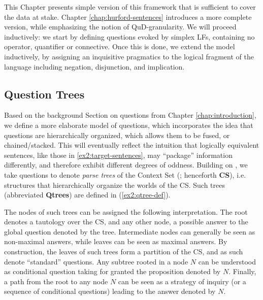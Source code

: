 This Chapter presents simple version of this framework that is sufficient to cover the data at stake. Chapter \ref{chap:hurford-sentences} introduces a more complete version, while emphasizing the notion of QuD-granularity. We will proceed inductively: we start by defining questions evoked by simplex LFs, containing no operator, quantifier or connective. Once this is done, we extend the model inductively, by assigning an inquisitive pragmatics to the logical fragment of the language including negation, disjunction, and implication.



\subsection{Question Trees}

Based on the background Section on questions from Chapter \ref{chap:introduction}, we define a more elaborate model of questions, which incorporates the idea that questions are hierarchically organized, which allows them to be fused, or chained/stacked. This will eventually reflect the intuition that logically equivalent sentences, like those in \ref{ex2:target-sentences}, may ``package'' information differently, and therefore exhibit different degrees of oddness. Building on \citet{Buring2003,Riester2019,Onea2016,Zhang2022}, we take questions to denote \textit{parse trees} of the Context Set (; henceforth \textbf{CS}), i.e. structures that hierarchically organize the worlds of the CS. Such trees (abbreviated \textbf{Qtrees}) are defined in (\ref{ex2:qtree-def}).

\begin{exe}
	\label{ex2:qtree-def}
\end{exe}


The nodes of such trees can be assigned the following interpretation. The root denotes a tautology over the CS, and any other node, a possible answer to the global question denoted by the tree. Intermediate nodes can generally be seen as non-maximal answers, while leaves can be seen as maximal answers. By construction, the leaves of such trees form a partition of the CS, and as such denote ``standard'' questions. Any subtree rooted in a node $N$ can be understood as conditional question taking for granted the proposition denoted by $N$. Finally, a path from the root to any node $N$ can be seen as a strategy of inquiry (or a sequence of conditional questions) leading to the answer denoted by $N$.\\

